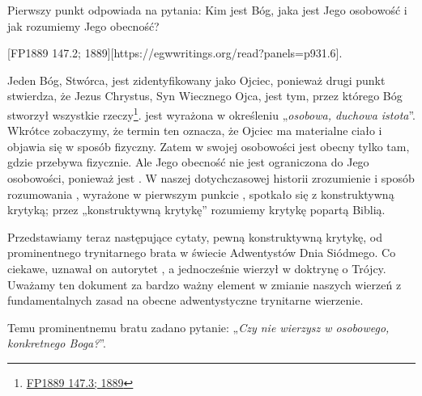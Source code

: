 
Pierwszy punkt  odpowiada na pytania: Kim jest Bóg, jaka jest Jego osobowość i jak rozumiemy Jego obecność?

[FP1889 147.2; 1889][https://egwwritings.org/read?panels=p931.6].

Jeden Bóg, Stwórca, jest zidentyfikowany jako Ojciec, ponieważ drugi punkt  stwierdza, że Jezus Chrystus, Syn Wiecznego Ojca, jest tym, przez którego Bóg stworzył wszystkie rzeczy\footnote{\href{https://egwwritings.org/?ref=en_FP1889.147.3&para=931.7}{FP1889 147.3; 1889}}.  jest wyrażona w określeniu „\textit{osobowa, duchowa istota}”. Wkrótce zobaczymy, że termin ten oznacza, że Ojciec ma materialne ciało i objawia się w sposób fizyczny. Zatem w swojej osobowości jest obecny tylko tam, gdzie przebywa fizycznie. Ale Jego obecność nie jest ograniczona do Jego osobowości, ponieważ jest . W naszej dotychczasowej historii zrozumienie i sposób rozumowania , wyrażone w pierwszym punkcie , spotkało się z konstruktywną krytyką; przez „konstruktywną krytykę” rozumiemy krytykę popartą Biblią.

Przedstawiamy teraz następujące cytaty, pewną konstruktywną krytykę, od prominentnego trynitarnego brata w świecie Adwentystów Dnia Siódmego. Co ciekawe, uznawał on autorytet , a jednocześnie wierzył w doktrynę o Trójcy. Uważamy ten dokument za bardzo ważny element w zmianie naszych wierzeń z fundamentalnych zasad na obecne adwentystyczne trynitarne wierzenie.

Temu prominentnemu bratu zadano pytanie: „\textit{Czy nie wierzysz w osobowego, konkretnego Boga?}”.


